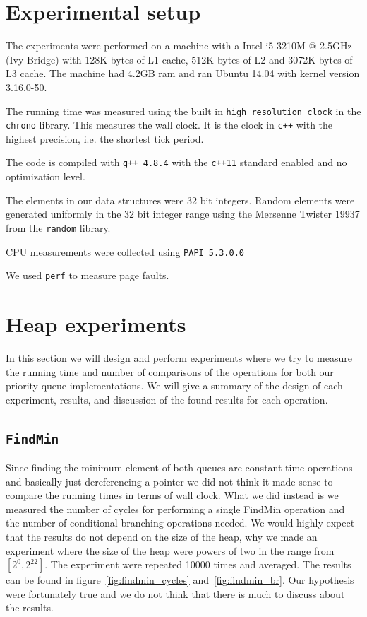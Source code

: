 \documentclass[a4paper,oneside,article,11pt]{memoir}
\begin{document}
\chapter{Experimental setup}
\label{chtp:experiment_setup}

The experiments were performed on a machine with a Intel i5-3210M @ 2.5GHz (Ivy Bridge) with 128K bytes of L1 cache, 512K bytes of L2 and 3072K bytes of L3 cache. The machine had 4.2GB ram and ran Ubuntu 14.04 with kernel version 3.16.0-50.

The running time was measured using the built in \texttt{high\_resolution\_clock} in the \texttt{chrono} library. This measures the wall clock. It is the clock in \texttt{c++} with the highest precision, i.e. the shortest tick period.

The code is compiled with \texttt{g++ 4.8.4} with the \texttt{c++11} standard enabled and no optimization level.

The elements in our data structures were 32 bit integers. Random elements were generated uniformly in the 32 bit integer range using the Mersenne Twister 19937 from the \texttt{random} library.

CPU measurements were collected using \texttt{PAPI 5.3.0.0}

We used \texttt{perf} to measure page faults.

\chapter{Heap experiments}
\label{heap_experiments}
In this section we will design and perform experiments where we try to measure the running time and number of comparisons of the operations for both our priority queue implementations. We will give a summary of the design of each experiment, results, and discussion of the found results for each operation.

\section{\texttt{FindMin}}
Since finding the minimum element of both queues are constant time operations and basically just dereferencing a pointer we did not think it made sense to compare the running times in terms of wall clock. What we did instead is we measured the number of cycles for performing a single FindMin operation and the number of conditional branching operations needed. We would highly expect that the results do not depend on the size of the heap, why we made an experiment where the size of the heap were powers of two in the range from $\left[2^0, 2^{22}\right]$. The experiment were repeated 10000 times and averaged. The results can be found in figure~\ref{fig:findmin_cycles} and~\ref{fig:findmin_br}.
Our hypothesis were fortunately true and we do not think that there is much to discuss about the results.
\end{document}
